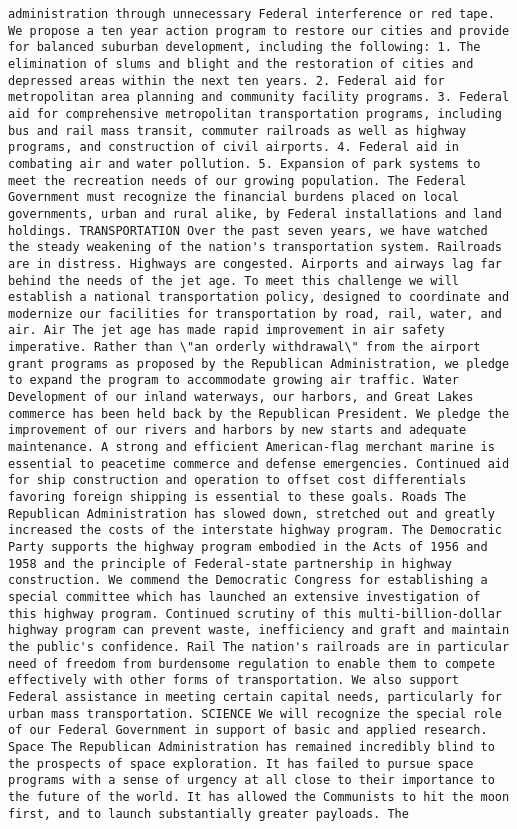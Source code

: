 \documentclass[
]{article}
\begin{document}
\begin{verbatim}
administration through unnecessary Federal interference or red tape. We propose a ten year action program to restore our cities and provide for balanced suburban development, including the following: 1. The elimination of slums and blight and the restoration of cities and depressed areas within the next ten years. 2. Federal aid for metropolitan area planning and community facility programs. 3. Federal aid for comprehensive metropolitan transportation programs, including bus and rail mass transit, commuter railroads as well as highway programs, and construction of civil airports. 4. Federal aid in combating air and water pollution. 5. Expansion of park systems to meet the recreation needs of our growing population. The Federal Government must recognize the financial burdens placed on local governments, urban and rural alike, by Federal installations and land holdings. TRANSPORTATION Over the past seven years, we have watched the steady weakening of the nation's transportation system. Railroads are in distress. Highways are congested. Airports and airways lag far behind the needs of the jet age. To meet this challenge we will establish a national transportation policy, designed to coordinate and modernize our facilities for transportation by road, rail, water, and air. Air The jet age has made rapid improvement in air safety imperative. Rather than \"an orderly withdrawal\" from the airport grant programs as proposed by the Republican Administration, we pledge to expand the program to accommodate growing air traffic. Water Development of our inland waterways, our harbors, and Great Lakes commerce has been held back by the Republican President. We pledge the improvement of our rivers and harbors by new starts and adequate maintenance. A strong and efficient American-flag merchant marine is essential to peacetime commerce and defense emergencies. Continued aid for ship construction and operation to offset cost differentials favoring foreign shipping is essential to these goals. Roads The Republican Administration has slowed down, stretched out and greatly increased the costs of the interstate highway program. The Democratic Party supports the highway program embodied in the Acts of 1956 and 1958 and the principle of Federal-state partnership in highway construction. We commend the Democratic Congress for establishing a special committee which has launched an extensive investigation of this highway program. Continued scrutiny of this multi-billion-dollar highway program can prevent waste, inefficiency and graft and maintain the public's confidence. Rail The nation's railroads are in particular need of freedom from burdensome regulation to enable them to compete effectively with other forms of transportation. We also support Federal assistance in meeting certain capital needs, particularly for urban mass transportation. SCIENCE We will recognize the special role of our Federal Government in support of basic and applied research. Space The Republican Administration has remained incredibly blind to the prospects of space exploration. It has failed to pursue space programs with a sense of urgency at all close to their importance to the future of the world. It has allowed the Communists to hit the moon first, and to launch substantially greater payloads. The 
\end{verbatim}
\end{document}
